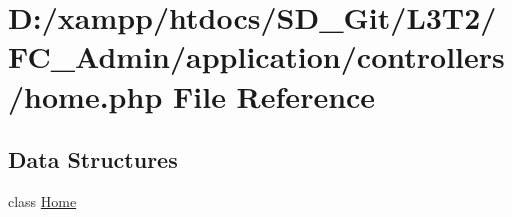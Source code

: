 \hypertarget{controllers_2home_8php}{}\section{D\+:/xampp/htdocs/\+S\+D\+\_\+\+Git/\+L3\+T2/\+F\+C\+\_\+\+Admin/application/controllers/home.php File Reference}
\label{controllers_2home_8php}
\subsection*{Data Structures}
\begin{DoxyCompactItemize}
\item 
class \hyperlink{class_home}{Home}
\end{DoxyCompactItemize}
